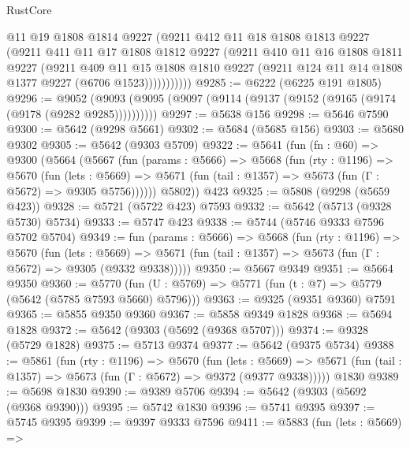 \begin{lexlean}{RustCore}
\begin{coremodule}
              @11
              @19
              @1808
              @1814
              @9227
              (@9211
                @412
                @11
                @18
                @1808
                @1813
                @9227
                (@9211
                  @411
                  @11
                  @17
                  @1808
                  @1812
                  @9227
                  (@9211
                    @410
                    @11
                    @16
                    @1808
                    @1811
                    @9227
                    (@9211
                      @409
                      @11
                      @15
                      @1808
                      @1810
                      @9227
                      (@9211 @124 @11 @14 @1808 @1377 @9227 (@6706 @1523)))))))))))
@9285 := @6222 (@6225 @191 @1805)
@9296 := @9052 (@9093 (@9095 (@9097 (@9114 (@9137 (@9152 (@9165 (@9174 (@9178 (@9282 @9285))))))))))
@9297 := @5638 @156
@9298 := @5646 @7590
@9300 := @5642 (@9298 @5661)
@9302 := @5684 (@5685 @156)
@9303 := @5680 @9302
@9305 := @5642 (@9303 @5709)
@9322 := @5641
    (fun (fn : @60) =>
    @9300
      (@5664
        (@5667
          (fun (params : @5666) =>
          @5668
            (fun (rty : @1196) =>
            @5670
              (fun (lets : @5669) =>
              @5671 (fun (tail : @1357) => @5673 (fun (Γ : @5672) => @9305 @5756))))))
        @5802))
    @423
@9325 := @5808 (@9298 (@5659 @423))
@9328 := @5721 (@5722 @423) @7593
@9332 := @5642 (@5713 (@9328 @5730) @5734)
@9333 := @5747 @423
@9338 := @5744 (@5746 @9333 @7596 @5702 @5704)
@9349 := fun (params : @5666) =>
  @5668
    (fun (rty : @1196) =>
    @5670
      (fun (lets : @5669) =>
      @5671 (fun (tail : @1357) => @5673 (fun (Γ : @5672) => @9305 (@9332 @9338)))))
@9350 := @5667 @9349
@9351 := @5664 @9350
@9360 := @5770 (fun (U : @5769) => @5771 (fun (t : @7) => @5779 (@5642 (@5785 @7593 @5660) @5796)))
@9363 := @9325 (@9351 @9360) @7591
@9365 := @5855 @9350 @9360
@9367 := @5858 @9349 @1828
@9368 := @5694 @1828
@9372 := @5642 (@9303 (@5692 (@9368 @5707)))
@9374 := @9328 (@5729 @1828)
@9375 := @5713 @9374
@9377 := @5642 (@9375 @5734)
@9388 := @5861
    (fun (rty : @1196) =>
    @5670
      (fun (lets : @5669) =>
      @5671 (fun (tail : @1357) => @5673 (fun (Γ : @5672) => @9372 (@9377 @9338)))))
    @1830
@9389 := @5698 @1830
@9390 := @9389 @5706
@9394 := @5642 (@9303 (@5692 (@9368 @9390)))
@9395 := @5742 @1830
@9396 := @5741 @9395
@9397 := @5745 @9395
@9399 := @9397 @9333 @7596
@9411 := @5883
    (fun (lets : @5669) =>

\end{coremodule}
\end{lexlean}
